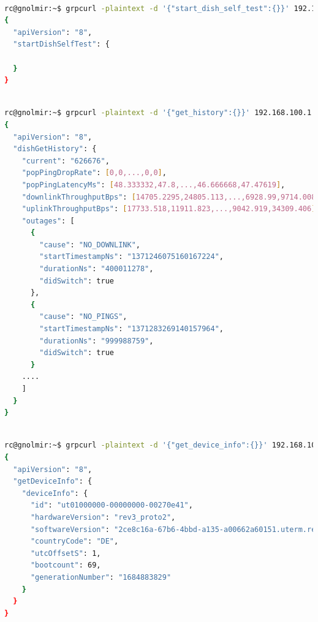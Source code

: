 \documentclass[IN,11pt,twoside,openright,idp,english]{tumthesis}
\begin{document}
\begin{lstlisting}[language=bash,basicstyle=\tiny]

rc@gnolmir:~$ grpcurl -plaintext -d '{"start_dish_self_test":{}}' 192.168.100.1:9200 SpaceX.API.Device.Device/Handle
{
  "apiVersion": "8",
  "startDishSelfTest": {
    
  }
}
\end{lstlisting}
\begin{lstlisting}[language=bash,basicstyle=\tiny]

rc@gnolmir:~$ grpcurl -plaintext -d '{"get_history":{}}' 192.168.100.1:9200 SpaceX.API.Device.Device/Handle
{
  "apiVersion": "8",
  "dishGetHistory": {
    "current": "626676",
    "popPingDropRate": [0,0,...,0,0],
    "popPingLatencyMs": [48.333332,47.8,...,46.666668,47.47619],
    "downlinkThroughputBps": [14705.2295,24805.113,...,6928.99,9714.008],
    "uplinkThroughputBps": [17733.518,11911.823,...,9042.919,34309.406],
    "outages": [
      {
        "cause": "NO_DOWNLINK",
        "startTimestampNs": "1371246075160167224",
        "durationNs": "400011278",
        "didSwitch": true
      },
      {
        "cause": "NO_PINGS",
        "startTimestampNs": "1371283269140157964",
        "durationNs": "999988759",
        "didSwitch": true
      }
    ....
    ]
  }
}
\end{lstlisting}
\begin{lstlisting}[language=bash,basicstyle=\tiny]

rc@gnolmir:~$ grpcurl -plaintext -d '{"get_device_info":{}}' 192.168.100.1:9200 SpaceX.API.Device.Device/Handle
{
  "apiVersion": "8",
  "getDeviceInfo": {
    "deviceInfo": {
      "id": "ut01000000-00000000-00270e41",
      "hardwareVersion": "rev3_proto2",
      "softwareVersion": "2ce8c16a-67b6-4bbd-a135-a00662a60151.uterm.release",
      "countryCode": "DE",
      "utcOffsetS": 1,
      "bootcount": 69,
      "generationNumber": "1684883829"
    }
  }
}
\end{lstlisting}
\end{document}
